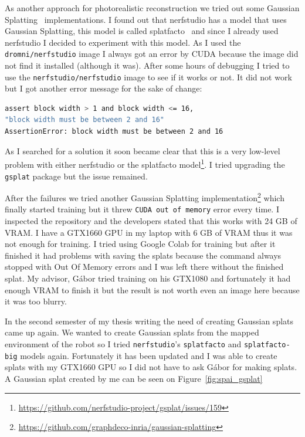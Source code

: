 As another approach for photorealistic reconstruction we tried out some Gaussian Splatting~\cite{3DGS} implementations. I found out that nerfstudio has a model that uses Gaussian Splatting, this model is called splatfacto~\cite{splatfacto} and since I already used nerfstudio I decided to experiment with this model. As I used the \verb|dromni/nerfstudio| image I always got an error by CUDA because the image did not find it installed (although it was). After some hours of debugging I tried to use the \verb|nerfstudio/nerfstudio| image to see if it works or not. It did not work but I got another error message for the sake of change:

\FloatBarrier
\begin{lstlisting}[language=bash,frame=single,float=!ht]
assert block width > 1 and block width <= 16, 
"block width must be between 2 and 16"
AssertionError: block width must be between 2 and 16
\end{lstlisting}

As I searched for a solution it soon became clear that this is a very low-level problem with either nerfstudio or the splatfacto model\footnote{\url{https://github.com/nerfstudio-project/gsplat/issues/159}}. I tried upgrading the \verb|gsplat| package but the issue remained.

After the failures we tried another Gaussian Splatting implementation\footnote{\url{https://github.com/graphdeco-inria/gaussian-splatting}} which finally started training but it threw \verb|CUDA out of memory| error every time. I inspected the repository and the developers stated that this works with 24 GB of VRAM. I have a GTX1660 GPU in my laptop with 6 GB of VRAM thus it was not enough for training. I tried using Google Colab for training but after it finished it had problems with saving the splats because the command always stopped with Out Of Memory errors and I was left there without the finished splat. My advisor, Gábor tried training on his GTX1080 and fortunately it had enough VRAM to finish it but the result is not worth even an image here because it was too blurry.

In the second semester of my thesis writing the need of creating Gaussian splats came up again. We wanted to create Gaussian splats from the mapped environment of the robot so I tried \verb|nerfstudio|'s \verb|splatfacto| and \verb|splatfacto-big| models again. Fortunately it has been updated and I was able to create splats with my GTX1660 GPU so I did not have to ask Gábor for making splats. A Gaussian splat created by me can be seen on Figure~\ref{fig:spai_gsplat}
